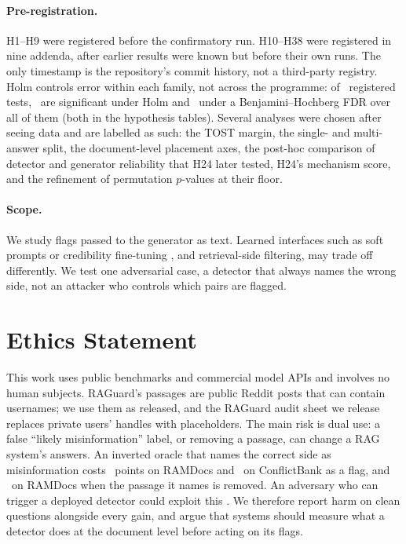 \paragraph{Pre-registration.} H1--H9 were registered before the confirmatory run. H10--H38
were registered in nine addenda, after earlier results were known but before their own runs. The only
timestamp is the repository's commit history, not a third-party registry. Holm controls error within each family, not
across the programme: of \fdrN\ registered tests, \fdrHolm\ are significant under Holm and \fdrBH\ under a
Benjamini--Hochberg FDR over all of them (both in the hypothesis tables). Several analyses were chosen after
seeing data and are labelled as such: the TOST margin, the single- and multi-answer split, the document-level
placement axes, the post-hoc comparison of detector and generator reliability that H24 later tested, H24's mechanism
score, and the refinement of permutation $p$-values at their floor.

\paragraph{Scope.} We study flags passed to the generator as text. Learned interfaces such as soft prompts or
credibility fine-tuning \citep{ye2026tcr,pan2024credibility}, and retrieval-side filtering, may trade off differently. We test one adversarial case, a detector that always names the wrong side, not an attacker who controls
which pairs are flagged.

\section*{Ethics Statement}
This work uses public benchmarks and commercial model APIs and involves no human subjects. RAGuard's passages are
public Reddit posts that can contain usernames; we use them as released, and the RAGuard audit sheet we release replaces private users' handles with placeholders. The main
risk is dual use: a false ``likely misinformation'' label, or removing a passage, can
change a RAG system's answers. An inverted oracle that names the correct side as misinformation costs \aadvDirConf\
points on RAMDocs and \azCbMiniOracleInvFlagDirectionalConflict\ on ConflictBank as a flag, and \aadvRemConf\ on
RAMDocs when the passage it names is removed. An adversary who can trigger a deployed detector could exploit this
\citep{zou2025poisonedrag}. We therefore report harm on clean questions alongside every gain, and argue that
systems should measure what a detector does at the document level before acting on its flags.
